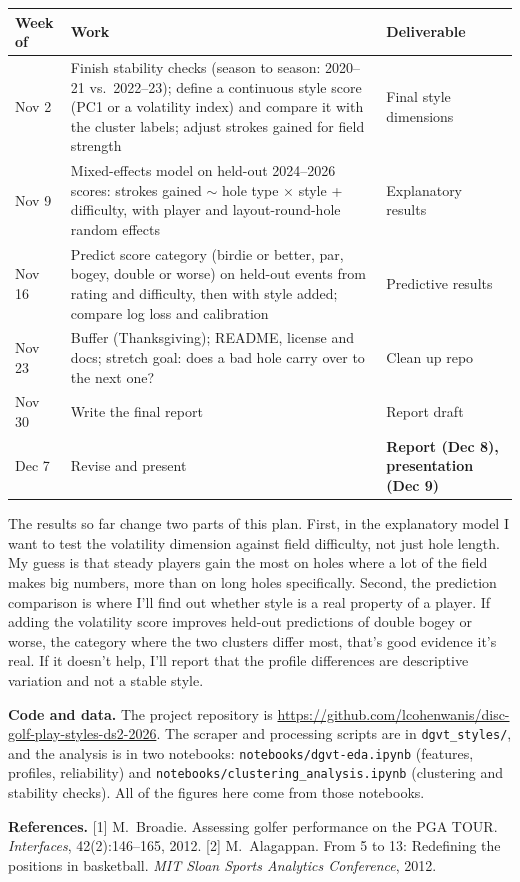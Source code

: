 \documentclass[10pt]{article}
\begin{document}
\begin{table}[H]
\centering
\footnotesize
\setlength{\tabcolsep}{4pt}
\renewcommand{\arraystretch}{0.92}
\begin{tabularx}{\textwidth}{@{}p{1.25cm}Y>{\raggedright\arraybackslash}p{4.2cm}@{}}
\toprule
\textbf{Week of} & \textbf{Work} & \textbf{Deliverable} \\
\midrule
Nov 2  & Finish stability checks (season to season: 2020--21 vs.\ 2022--23); define a continuous style score (PC1 or a volatility index) and compare it with the cluster labels; adjust strokes gained for field strength &
  Final style dimensions \\
Nov 9  & Mixed-effects model on held-out 2024--2026 scores: strokes gained $\sim$ hole type $\times$ style + difficulty, with player and layout-round-hole random effects &
  Explanatory results \\
Nov 16 & Predict score category (birdie or better, par, bogey, double or worse) on held-out events from rating and difficulty, then with style added; compare log loss and calibration &
  Predictive results \\
Nov 23 & Buffer (Thanksgiving); README, license and docs; stretch goal: does a bad hole carry over to the next one? &
  Clean up repo \\
Nov 30 & Write the final report & Report draft \\
Dec 7  & Revise and present &
  \textbf{Report (Dec 8), presentation (Dec 9)} \\
\bottomrule
\end{tabularx}
\end{table}

The results so far change two parts of this plan. First, in the explanatory model I want to test the volatility dimension against field difficulty, not just hole length. My guess is that steady players gain the most on holes where a lot of the field makes big numbers, more than on long holes specifically. Second, the prediction comparison is where I'll find out whether style is a real property of a player. If adding the volatility score improves held-out predictions of double bogey or worse, the category where the two clusters differ most, that's good evidence it's real. If it doesn't help, I'll report that the profile differences are descriptive variation and not a stable style.

\textbf{Code and data.} The project repository is \url{https://github.com/lcohenwanis/disc-golf-play-styles-ds2-2026}. The scraper and processing scripts are in \texttt{dgvt\_styles/}, and the analysis is in two notebooks: \texttt{notebooks/dgvt-eda.ipynb} (features, profiles, reliability) and \texttt{notebooks/clustering\_analysis.ipynb} (clustering and stability checks). All of the figures here come from those notebooks.

{\footnotesize
\textbf{References.}
[1] M.~Broadie. Assessing golfer performance on the PGA TOUR.
\emph{Interfaces}, 42(2):146--165, 2012.
[2] M.~Alagappan. From 5 to 13: Redefining the positions in basketball.
\emph{MIT Sloan Sports Analytics Conference}, 2012.
}
\end{document}
